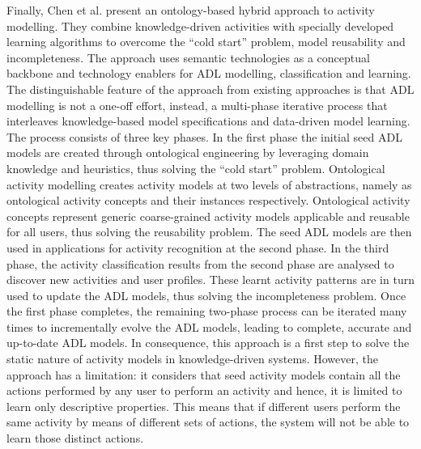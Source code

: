 Finally, Chen et al. \cite{Chen2014} present an ontology-based hybrid approach to activity modelling. They combine knowledge-driven activities with specially developed learning algorithms to overcome the ``cold start'' problem, model reusability and incompleteness. The approach uses semantic technologies as a conceptual backbone and technology enablers for ADL modelling, classification and learning. The distinguishable feature of the approach from existing approaches is that ADL modelling is not a one-off effort, instead, a multi-phase iterative process that interleaves knowledge-based model specifications and data-driven model learning. The process consists of three key phases. In the first phase the initial seed ADL models are created through ontological engineering by leveraging domain knowledge and heuristics, thus solving the ``cold start'' problem. Ontological activity modelling creates activity models at two levels of abstractions, namely as ontological activity concepts and their instances respectively. Ontological activity concepts represent generic coarse-grained activity models applicable and reusable for all users, thus solving the reusability problem. The seed ADL models are then used in applications for activity recognition at the second phase. In the third phase, the activity classification results from the second phase are analysed to discover new activities and user profiles. These learnt activity patterns are in turn used to update the ADL models, thus solving the incompleteness problem. Once the first phase completes, the remaining two-phase process can be iterated many times to incrementally evolve the ADL models, leading to complete, accurate and up-to-date ADL models. In consequence, this approach is a first step to solve the static nature of activity models in knowledge-driven systems. However, the approach has a limitation: it considers that seed activity models contain all the actions performed by any user to perform an activity and hence, it is limited to learn only descriptive properties. This means that if different users perform the same activity by means of different sets of actions, the system will not be able to learn those distinct actions. 